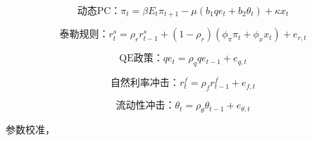 \documentclass[cn,12pt,math=newtx,citestyle=gb7714-2015,bibstyle=gb7714-2015]{elegantbook}
\begin{document}
	
	\begin{equation}
		\text{动态PC：}\pi_t =\beta E_t \pi_{t+1}  - \mu (b_1 qe_t + b_2 \theta_t) + \kappa x_t
	\end{equation}
	
	\begin{equation}
		\text{泰勒规则：} r_t^s =\rho_r r_{t-1}^s + (1-\rho_r)(\phi_\pi \pi_{t} + \phi_x x_t) + e_{r,t}
	\end{equation}
	
	\begin{equation}
		\text{QE政策：} qe_t =\rho_q qe_{t-1}  + e_{q,t}
	\end{equation}
	
	\begin{equation}
		\text{自然利率冲击：}r_t^f =\rho_f r_{t-1}^f + e_{f,t}
	\end{equation}
	
	\begin{equation}
		\text{流动性冲击：}\theta_t =\rho_\theta \theta_{t-1} + e_{\theta,t}
	\end{equation}
	
	参数校准，
	
\end{document}
